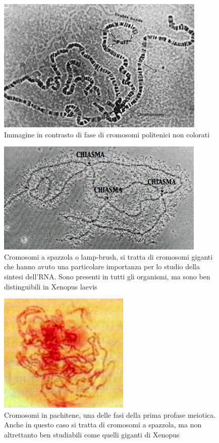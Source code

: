 \documentclass[11pt]{book}
\begin{document}
\begin{figure}[h]
\centering
\includegraphics[scale=0.40]{img/04_cromo.png}
\caption{Immagine in contrasto di fase di cromosomi politenici non colorati}
\label{}
\end{figure}

\begin{figure}[h!]
\centering
\includegraphics[scale=0.40]{img/05_cromospazzola.png}
\caption{Cromosomi a spazzola o lamp-brush, si tratta di cromosomi giganti che hanno avuto una particolare importanza per lo studio della sintesi dell’RNA. Sono presenti in tutti gli organismi, ma sono ben distinguibili in Xenopus laevis}
\label{}
\end{figure}

\begin{figure}[h!]
\centering
\includegraphics[scale=0.50]{img/06_cromopachitenespazzola.png}
\caption{Cromosomi in pachitene, una delle fasi della prima profase meiotica. Anche in questo caso si tratta di cromosomi a spazzola, ma non altrettanto ben studiabili come quelli giganti di Xenopus}
\label{}
\end{figure}
\end{document}
